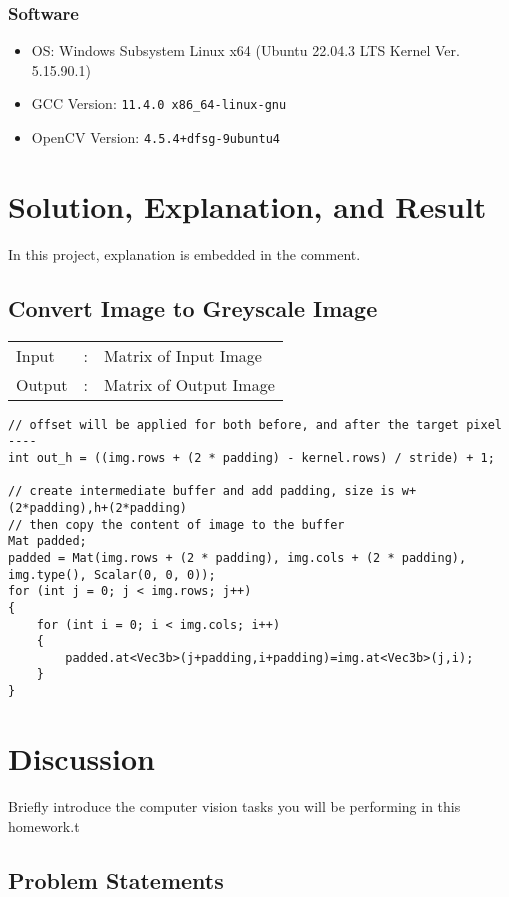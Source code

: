 \documentclass[12pt,a4paper]{report}
\begin{document}
\subsection{Software}
\begin{itemize}
  \item OS\@: Windows Subsystem Linux x64 (Ubuntu 22.04.3 LTS Kernel Ver. 5.15.90.1)
  \item GCC Version\@: \verb|11.4.0 x86_64-linux-gnu|
  \item OpenCV Version\@: \verb|4.5.4+dfsg-9ubuntu4|
\end{itemize}

\chapter{Solution, Explanation, and Result}
In this project, explanation is embedded in the comment.
\section{Convert Image to Greyscale Image}
\begin{tabular}{lll}
  Input  & : & Matrix of Input Image  \\
  Output & : & Matrix of Output Image \\
\end{tabular}

\begin{lstlisting}
// offset will be applied for both before, and after the target pixel ----
int out_h = ((img.rows + (2 * padding) - kernel.rows) / stride) + 1;

// create intermediate buffer and add padding, size is w+(2*padding),h+(2*padding)
// then copy the content of image to the buffer
Mat padded;
padded = Mat(img.rows + (2 * padding), img.cols + (2 * padding), img.type(), Scalar(0, 0, 0));
for (int j = 0; j < img.rows; j++)
{
    for (int i = 0; i < img.cols; i++)
    {
        padded.at<Vec3b>(j+padding,i+padding)=img.at<Vec3b>(j,i);
    }
}

\end{lstlisting}


\chapter{Discussion}
Briefly introduce the computer vision tasks you will be performing in this homework.t

\section{Problem Statements}
\end{document}
